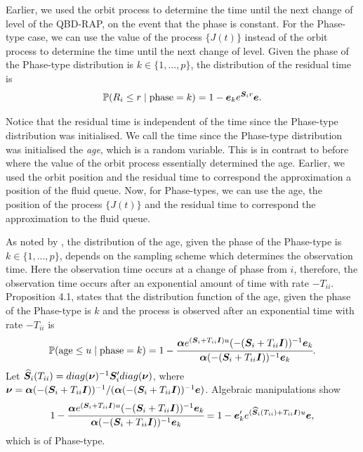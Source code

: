 Earlier, we used the orbit process to determine the time until the next change of level of the QBD-RAP, on the event that the phase is constant. For the Phase-type case, we can use the value of the process \(\{J(t)\}\) instead of the orbit process to determine the time until the next change of level. 
Given the phase of the Phase-type distribution is \(k\in\{1,...,p\}\), the distribution of the residual time is 
\[\mathbb P(R_i\leq r \mid \mbox{phase}=k)=1-\boldsymbol e_k e^{\boldsymbol S_i r}\boldsymbol e.\]

Notice that the residual time is independent of the time since the Phase-type distribution was initialised. We call the time since the Phase-type distribution was initialised the \emph{age}, which is a random variable. This is in contrast to before where the value of the orbit process essentially determined the age. Earlier, we used the orbit position and the residual time to correspond the approximation a position of the fluid queue. Now, for Phase-types, we can use the age, the position of the process \(\{J(t)\}\) and the residual time to correspond the approximation to the fluid queue. 

As noted by \cite{hmp2017}, the distribution of the age, given the phase of the Phase-type is \(k\in\{1,...,p\}\), depends on the sampling scheme which determines the observation time. Here the observation time occurs at a change of phase from \(i\), therefore, the observation time occurs after an exponential amount of time with rate \(-T_{ii}\). Proposition 4.1, \cite{hmp2017} states that the distribution function of the age, given the phase of the Phase-type is \(k\) and the process is observed after an exponential time with rate \(-T_{ii}\) is 
\[\mathbb P(\mbox{age}\leq u \mid \mbox{phase}=k )=1-\cfrac{\boldsymbol \alpha e^{(\boldsymbol S_i + T_{ii}\boldsymbol I)u}(-(\boldsymbol S_i+ T_{ii}\boldsymbol I))^{-1}\boldsymbol e_k}{\boldsymbol \alpha (-(\boldsymbol S_i+ T_{ii}\boldsymbol I))^{-1}\boldsymbol e_k}.\]
Let \(\widehat{ \boldsymbol S}_i(T_{ii}) = diag(\boldsymbol \nu)^{-1}\boldsymbol S_i'diag(\boldsymbol \nu)\), where \(\boldsymbol \nu = \boldsymbol\alpha(-(\boldsymbol S_i+ T_{ii}\boldsymbol I))^{-1}/(\boldsymbol\alpha(-(\boldsymbol S_i+ T_{ii}\boldsymbol I))^{-1}\boldsymbol e)\). Algebraic manipulations show
\begin{align}
	1-\cfrac{\boldsymbol \alpha e^{(\boldsymbol S_i + T_{ii}\boldsymbol I)u}(-(\boldsymbol S_i+ T_{ii}\boldsymbol I))^{-1}\boldsymbol e_k}{\boldsymbol \alpha (-(\boldsymbol S_i+ T_{ii}\boldsymbol I))^{-1}\boldsymbol e_k}
	= 1-\boldsymbol e_k' e^{(\widehat{\boldsymbol S}_i(T_{ii}) + T_{ii}\boldsymbol I)u} \boldsymbol e,\label{eqn: skgj}
\end{align}
which is of Phase-type. 

